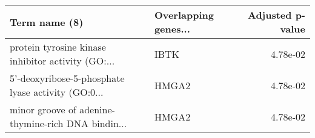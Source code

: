 \begin{tabular}{llr}
\toprule
                                     Term name (8) & Overlapping genes... &  Adjusted p-value \\
\midrule
protein tyrosine kinase inhibitor activity (GO:... &                 IBTK &          4.78e-02 \\
5'-deoxyribose-5-phosphate lyase activity (GO:0... &                HMGA2 &          4.78e-02 \\
minor groove of adenine-thymine-rich DNA bindin... &                HMGA2 &          4.78e-02 \\
\bottomrule
\end{tabular}
